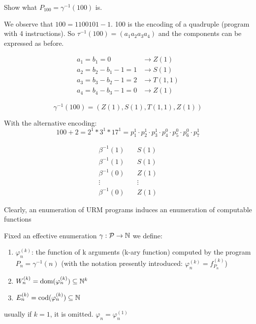 \begin{example}
  Show what $P_{100} = \gamma^{-1}(100)$ is.

  We observe that $100 = 1100101 - 1$. 100 is the encoding of a
  quadruple (program with 4 instructions). So
  $\tau^{-1}(100) = (a_1 a_2 a_3 a_4)$ and the components can be
  expressed as before.

  \[
    \begin{split}
      a_1 = b_1 = 0 & \to Z(1) \\
      a_2 = b_2 - b_1 - 1 = 1 & \to S(1) \\
      a_3 = b_3 - b_2 - 1 = 2 & \to T(1,1) \\
      a_4 = b_4 - b_3 - 1 = 0 & \to Z(1)
    \end{split}
  \]

  \[\gamma^{-1}(100) = (Z(1), S(1), T(1,1), Z(1))\]

  With the alternative encoding:
  \[100 + 2 = 2^1 * 3^1 * 17^1 = p_1^1 \cdot p_2^1 \cdot p_3^1 \cdot
    p_4^0 \cdot p_5^0 \cdot p_6^0 \cdot p_7^1 \]

  \[
    \begin{split}
      \beta^{-1}(1) & \quad S(1) \\
      \beta^{-1}(1) & \quad S(1) \\
      \beta^{-1}(0) & \quad Z(1) \\
      \vdots & \quad\vdots \\
      \beta^{-1}(0) & \quad Z(1)
    \end{split}
  \]
\end{example}

Clearly, an enumeration of URM programs induces an enumeration of computable functions

\begin{definition}
  Fixed an effective enumeration
  $\gamma : \mathcal{P} \to \mathbb{N}$ we define:
  \begin{enumerate}[label=\arabic*.]
  \item $\varphi_n^{(k)}$: the function of k arguments (k-ary
    function) computed by the program $P_n = \gamma^{-1}(n)$ (with
    the notation presently introduced: $\varphi_n^{(k)} = f_{P_n}^{(k)}$)
  \item $W_n^{(k)} = \mbox{dom}(\varphi_n^{(k)}) \subseteq \mathbb{N}^k $
  \item $E_n^{(k)} = \mbox{cod}(\varphi_n^{(k)}) \subseteq \mathbb{N}$
  \end{enumerate}

  usually if $k=1$, it is omitted. $\varphi_n = \varphi_n^{(1)}$
\end{definition}

